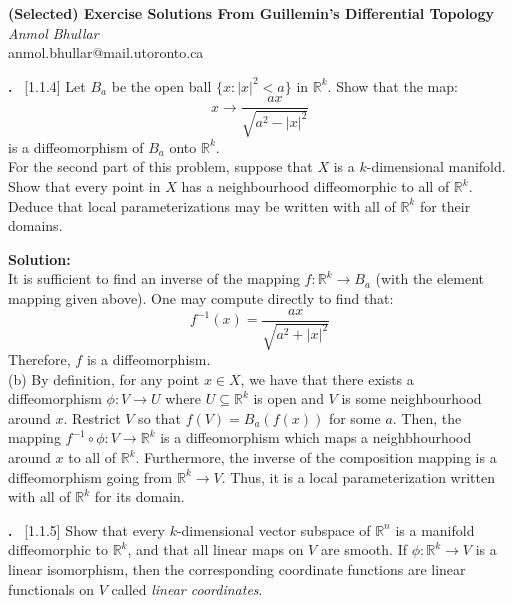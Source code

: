 \documentclass{article}
\newcounter{problem}
\newcounter{solution}
\newcommand\Problem{%
  \stepcounter{problem}%
  \textbf{\theproblem.}~%
  \setcounter{solution}{0}%
}
\newcommand\TheSolution{%
  \textbf{Solution:}\\%
}
\begin{document}
\begin{titlepage}
    \begin{center}
        \Large\textbf{(Selected) Exercise Solutions From Guillemin's %
            Differential Topology}\\
        \large\textit{Anmol Bhullar}\\
        \large{anmol.bhullar@mail.utoronto.ca}
    \end{center}
\end{titlepage}

\Problem[1.1.4] Let $B_{a}$ be the open ball $\{x:|x|^{2}<a\}$ in %
$\mathbb{R}^k$. Show that the map: 
\[x \to \frac{ax}{\sqrt{a^{2}-|x|^2}}\]
is a diffeomorphism of $B_{a}$ onto $\mathbb{R}^{k}$.\\
For the second %
part of this problem, suppose that $X$ is a $k$-dimensional manifold. %
Show that every point in $X$ has a neighbourhood diffeomorphic to %
all of $\mathbb{R}^k$. Deduce that local parameterizations may be %
written with all of $\mathbb{R}^k$ for their domains.

\TheSolution It is sufficient to find an inverse of the mapping %
$f: \mathbb{R}^k \to B_{a}$ (with the element mapping given above).
One may compute directly to find that:
\[f^{-1}(x) = \frac{ax}{\sqrt{a^2+|x|^2}}\]
Therefore, $f$ is a diffeomorphism.\\
(b) By definition, for any point $x\in X$, we have that there %
exists a diffeomorphism $\phi: V \to U$ where %
$U\subseteq\mathbb{R}^k$ is open and $V$ is some neighbourhood %
around $x$. Restrict $V$ so that $f(V)=B_a(f(x))$ for some $a$.
Then, the mapping $f^{-1}\circ \phi: V \to \mathbb{R}^k$ %
is a diffeomorphism which maps a neighbhourhood around $x$ to all %
of $\mathbb{R}^k$. Furthermore, the inverse of the composition %
mapping is a diffeomorphism going from $\mathbb{R}^k \to V$.
Thus, it is a local parameterization written with all of %
$\mathbb{R}^k$ for its domain.

\Problem[1.1.5] Show that every $k$-dimensional vector subspace %
of $\mathbb{R}^n$ is a manifold diffeomorphic to $\mathbb{R}^k$, %
and that all linear maps on $V$ are smooth. %
If $\phi: \mathbb{R}^k \to V$ is a linear isomorphism, then the %
corresponding coordinate functions are linear functionals %
on $V$ called \textit{linear coordinates}.
\end{document}
